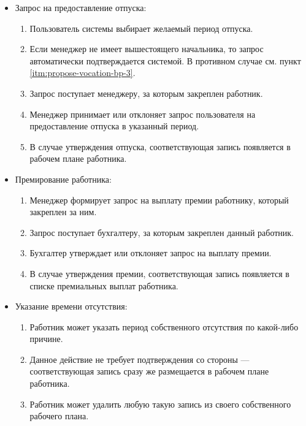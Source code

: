 \begin{itemize}
    \item Запрос на предоставление отпуска:
    \begin{enumerate}
        \item Пользователь системы выбирает желаемый период отпуска.
        \item Если менеджер не имеет вышестоящего начальника, то запрос автоматически подтверждается системой. В противном случае см. 
            пункт \ref{itm:propose-vocation-bp-3}.
        \item \label{itm:propose-vocation-bp-3} Запрос поступает менеджеру, за которым закреплен работник.
        \item Менеджер принимает или отклоняет запрос пользователя на предоставление отпуска в указанный период.
        \item В случае утверждения отпуска, соответствующая запись появляется в рабочем плане работника.
    \end{enumerate}
    \item Премирование работника:
    \begin{enumerate}
        \item Менеджер формирует запрос на выплату премии работнику, который закреплен за ним.
        \item Запрос поступает бухгалтеру, за которым закреплен данный работник.
        \item Бухгалтер утверждает или отклоняет запрос на выплату премии.
        \item В случае утверждения премии, соответствующая запись появляется в списке премиальных выплат работника.
    \end{enumerate}
    \item Указание времени отсутствия:
    \begin{enumerate}
        \item Работник может указать период собственного отсутствия по какой-либо причине.
        \item Данное действие не требует подтверждения со стороны --- соответствующая запись сразу же размещается в рабочем плане работника.
        \item Работник может удалить любую такую запись из своего собственного рабочего плана.
    \end{enumerate}
\end{itemize}

